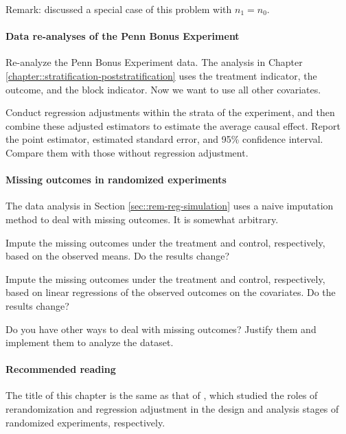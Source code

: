 Remark: \citet[][page 28]{gerber2012field} discussed a special case  of this problem with $n_1=n_0.$



\paragraph{Data re-analyses of the Penn Bonus Experiment}

 
Re-analyze the Penn Bonus Experiment data. The analysis in Chapter \ref{chapter::stratification-poststratification} uses the treatment indicator, the outcome, and the block indicator. Now we want to use all other covariates. 

Conduct regression adjustments within the strata of the experiment, and then combine these adjusted estimators to estimate the average causal effect. Report the point estimator, estimated standard error, and 95\% confidence interval. Compare them with those without regression adjustment. 
 

\paragraph{Missing outcomes in randomized experiments}\label{hw::missing-y-experiments}

The data analysis in Section \ref{sec::rem-reg-simulation} uses a naive imputation method to deal with missing outcomes. It is somewhat arbitrary. 

Impute the missing outcomes under the treatment and control, respectively,  based on the observed means. Do the results change?

Impute the missing outcomes under the treatment and control, respectively, based on linear regressions of the observed outcomes on the covariates. Do the results change? 

Do you have other ways to deal with missing outcomes? Justify them and implement them to analyze the dataset. 




\paragraph{Recommended reading}

The title of this chapter is the same as that of \citet{li2019rerandomization}, which studied the roles of rerandomization and regression adjustment in the design and analysis stages of randomized experiments, respectively. 


